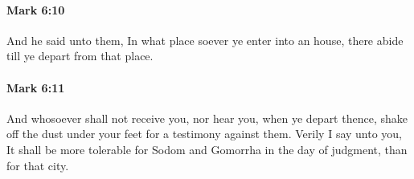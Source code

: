 		\paragraph{Mark 6:10} %
			\label{MARK-6-10}

			And he said unto them, In what place soever ye enter into an house, there abide till ye depart from that place.

			\begin{framed}
			\scriptsize
				\begin{compactdesc}
					\item[SBLG] 
				\end{compactdesc}
			\end{framed}

		\paragraph{Mark 6:11} %
			\label{MARK-6-11}

			And whosoever shall not receive you, nor hear you, when ye depart thence, shake off the dust under your feet for a testimony against them. Verily I say unto you, It shall be more tolerable for Sodom and Gomorrha in the day of judgment, than for that city.

